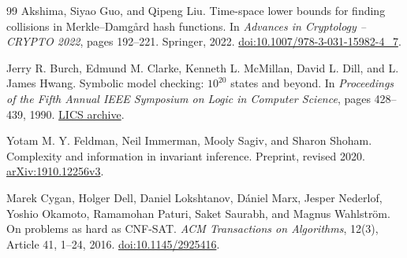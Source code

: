 \documentclass[11pt]{article}
\theoremstyle{definition}
\theoremstyle{remark}
\numberwithin{equation}{section}
\begin{document}
\begin{thebibliography}{99}
Akshima, Siyao Guo, and Qipeng Liu.
\newblock Time-space lower bounds for finding collisions in
{M}erkle--{D}amg{\aa}rd hash functions.
\newblock In \emph{Advances in Cryptology -- CRYPTO 2022}, pages 192--221.
Springer, 2022.
\newblock \href{https://doi.org/10.1007/978-3-031-15982-4_7}{doi:10.1007/978-3-031-15982-4\_7}.

Jerry R. Burch, Edmund M. Clarke, Kenneth L. McMillan, David L. Dill, and
L. James Hwang.
\newblock Symbolic model checking: $10^{20}$ states and beyond.
\newblock In \emph{Proceedings of the Fifth Annual IEEE Symposium on
Logic in Computer Science}, pages 428--439, 1990.
\newblock \href{https://lics.siglog.org/1990/BurchClarkeMcMillan-Symbolicmodelchecki.html}{LICS archive}.

Yotam M. Y. Feldman, Neil Immerman, Mooly Sagiv, and Sharon Shoham.
\newblock Complexity and information in invariant inference.
\newblock Preprint, revised 2020.
\newblock \href{https://arxiv.org/abs/1910.12256v3}{arXiv:1910.12256v3}.

Marek Cygan, Holger Dell, Daniel Lokshtanov, D\'aniel Marx, Jesper Nederlof,
Yoshio Okamoto, Ramamohan Paturi, Saket Saurabh, and Magnus Wahlstr\"om.
\newblock On problems as hard as CNF-SAT.
\newblock \emph{ACM Transactions on Algorithms}, 12(3), Article 41,
1--24, 2016.
\newblock \href{https://doi.org/10.1145/2925416}{doi:10.1145/2925416}.

\end{thebibliography}
\end{document}
